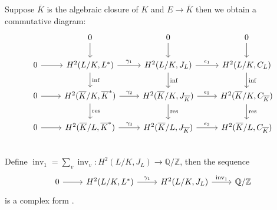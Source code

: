 \documentclass{article}
\theoremstyle{break}
\def\inv{\mathop{\mathrm{inv}}\nolimits}
\def\rest{\mathop{\mathrm{res}}\nolimits}
\def\inf{\mathop{\mathrm{inf}}\nolimits}
\def\inv{\mathop{\mathrm{inv}}\nolimits}
\begin{document}
Suppose $\overline{K}$ is the algebraic closure of $K$ and $E\rightarrow \overline{K}$ then we obtain a commutative diagram:
\[\begin{tikzcd}
{ } & 0\arrow{d} & 0 \arrow{d} & 0\arrow{d} \\
0\arrow{r}  & H^{2}(L/K, L^{*} )\arrow{r}{\gamma_1}\arrow{d}{\inf} & H^{2}(L/K, J_{L} )\arrow{r}{\epsilon_1}\arrow{d}{\inf} & H^{2}(L/K, C_{L} )\arrow{d}{\inf}\\
0\arrow{r}  & H^{2}(\overline{K}/K, \overline{K}^{*} )\arrow{r}{\gamma_2}\arrow{d}{\rest}  & H^{2}(\overline{K}/K, J_{\overline{K}} )\arrow{r}{\epsilon_2}\arrow{d}{\rest} & H^{2}(\overline{K}/K, C_{\overline{K}} )\arrow{d}{\rest}\\   
0\arrow{r}  & H^{2}(\overline{K}/L, \overline{K}^{*} )\arrow{r}{\gamma_3} & H^{2}(\overline{K}/L, J_{\overline{K}} )\arrow{r}{\epsilon_3}& H^{2}(\overline{K}/L, C_{\overline{K}} )\\   
\end{tikzcd}
\]
Define $\inv_{1} = \sum_{v}^{} \inv_v: H^{2}( L/K , J_L ) \rightarrow \mathbb{Q}/\mathbb{Z}$, then the sequence \[ \begin{tikzcd} 0\arrow{r}  & H^{2}(L/K, L^{*} )\arrow{r}{\gamma_1} & H^{2}(L/K, J_{L} )\arrow{r}{\inv_1} &  \mathbb{Q}/\mathbb{Z} \end{tikzcd} \]
is a complex form \cite{Cassels}.%
\end{document}
